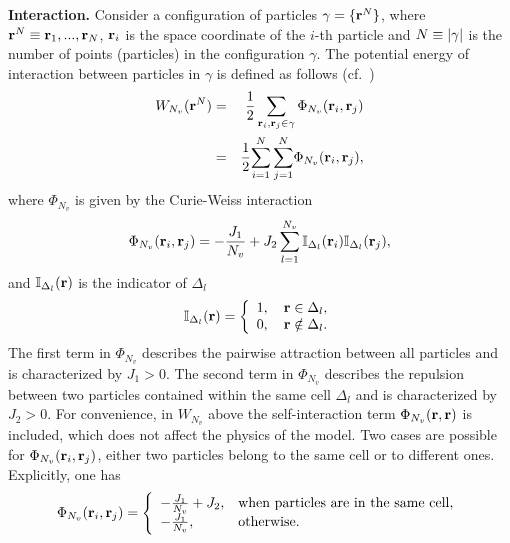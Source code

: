 \documentclass[12pt]{article}
\numberwithin{equation}{section}
\begin{document}
	\textbf{Interaction.} Consider a configuration of particles $\gamma = \{\vb{r}^N\}$, where $\vb{r}^N \equiv \vb{r}_1, ..., \vb{r}_N$, $\vb{r}_i$ is the space coordinate of the $i$-th particle and $N \equiv \abs{\gamma}$ is the number of points (particles) in the configuration $\gamma$. The potential energy of interaction between particles in $\gamma$ is defined as follows (cf.~\cite[eq.~(2.5.16)]{HansenMcDonald13})
	\begin{eqnarray*}
		W_{N_v}(\vb{r}^N) & = & \frac{1}{2} \sum_{\vb{r}_i,\vb{r}_j \in \gamma} \Phi_{N_v} (\vb{r}_i,\vb{r}_j)
		\\
		& = & \frac12 {\sum_{i=1}^N \sum_{j=1}^N} \Phi_{N_v} (\vb{r}_i,\vb{r}_j),
	\end{eqnarray*}
	where $\Phi_{N_v}$ is given by the Curie-Weiss interaction
	\begin{equation}
		\label{def:curie-weiss-pot}
		\Phi_{N_v}(\vb{r}_i, \vb{r}_j) = -\frac{J_1}{N_v} + J_2\sum_{l=1}^{N_v} \mathbb{I}_{\Delta_l}(\vb{r}_i) \mathbb{I}_{\Delta_l}(\vb{r}_j),
	\end{equation}
	and $\mathbb{I}_{\Delta_l}(\vb{r})$ is the indicator of $\Delta_l$
	\begin{equation}
		\label{def:I}
		\mathbb{I}_{\Delta_l} (\vb{r}) = \left\{
		\begin{array}{ll}
			1, \quad \vb{r} \in \Delta_l,
			\\
			0, \quad \vb{r} \notin \Delta_l.
		\end{array}
		\right.
	\end{equation}
	The first term in $\Phi_{N_v}$ describes the pairwise attraction between all particles and is characterized by $J_1 > 0$. The second term in $\Phi_{N_v}$ describes the repulsion between two particles contained within the same cell $\Delta_l$ and is characterized by $J_2 > 0.$ For convenience, in $W_{N_v}$ above the self-interaction term $\Phi_{N_v}(\vb{r},\vb{r})$ is included, which does not affect the physics of the model. Two cases are possible for $\Phi_{N_v}(\vb{r}_i, \vb{r}_j)$, either two particles belong to the same cell or to different ones. Explicitly, one has
	\begin{equation}
		\Phi_{N_v}(\vb{r}_i, \vb{r}_j) = \left\{
		\begin{array}{ll}
			-\frac{J_1}{N_v} + J_2, & \text{when particles are in the same cell,}
			\\
			-\frac{J_1}{N_v}, & \text{otherwise.}
		\end{array}
		\right.
	\end{equation}
	
\end{document}
